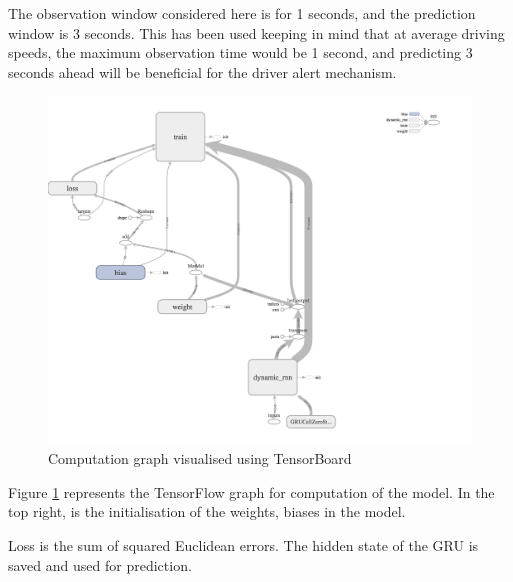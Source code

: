 The observation window considered here is for 1 seconds, and the prediction window is 3 seconds. This has been used keeping in mind that at average driving speeds, the maximum observation time would be 1 second, and predicting 3 seconds ahead will be beneficial for the driver alert mechanism.
\begin{figure}[ht]
    \centering
    \includegraphics[width=\textwidth]{Figures/TF_graph.png}
    \caption[Network computation]{ Computation graph visualised using TensorBoard}

    \label{fig:tf_graph}
\end{figure}

Figure \ref{fig:tf_graph} represents the TensorFlow graph for computation of the model. In the top right, is the initialisation of the weights, biases in the model.

Loss is the sum of squared Euclidean errors. The hidden state of the GRU is saved and used for prediction. 